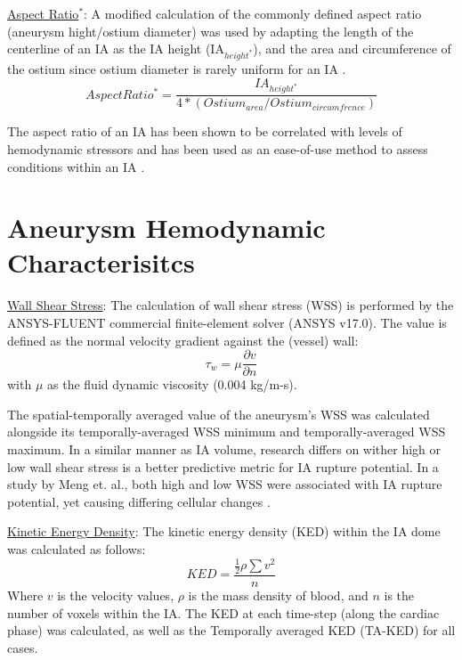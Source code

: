 \underline{Aspect Ratio$^*$}: A modified calculation of the commonly defined aspect ratio (aneurysm hight/ostium diameter) was used by adapting the length of the centerline of an IA as the IA height (IA$_{height^*}$), and the area and circumference of the ostium since ostium diameter is rarely uniform for an IA \cite{piccinelli2012characterization}.
\begin{equation}
Aspect Ratio^* = \frac{IA_{height^*}}{4*(Ostium_{area} / Ostium_{circumfrence})}
\end{equation}

The aspect ratio of an IA has been shown to be correlated with levels of hemodynamic stressors and has been used as an ease-of-use method to assess conditions within an IA \cite{zeng2011can}.  

\section{Aneurysm Hemodynamic Characterisitcs}\label{CHAPTER1_SECTION3}


\underline{Wall Shear Stress}: 
The calculation of wall shear stress (WSS) is performed by the ANSYS-FLUENT commercial finite-element solver (ANSYS v17.0). The value is defined as the normal velocity gradient against the (vessel) wall:
\begin{equation} \label{WSS}
\tau_w = \mu\frac{\partial v}{\partial n}
\end{equation}
with $\mu$ as the fluid dynamic viscosity (0.004 kg/m-s). 

The spatial-temporally averaged value of the aneurysm's WSS was calculated alongside its temporally-averaged WSS minimum and temporally-averaged WSS maximum. In a similar manner as IA volume, research differs on wither high \cite{dolan2013high} or low \cite{Zhang2016} wall shear stress is a better predictive metric for IA rupture potential. In a study by Meng et. al., both high and low WSS were associated with IA rupture potential, yet causing differing cellular changes \cite{Meng1254}. 

\underline{Kinetic Energy Density}:
The kinetic energy density (KED) within the IA dome was calculated as follows:
		\begin{equation}
KED = \frac{\frac{1}{2}\rho\sum v^2}{n}
	\end{equation}
Where $v$ is the velocity values, $\rho$ is the mass density of blood, and $n$ is the number of voxels within the IA. The KED at each time-step (along the cardiac phase) was calculated, as well as the Temporally averaged KED (TA-KED) for all cases. 

